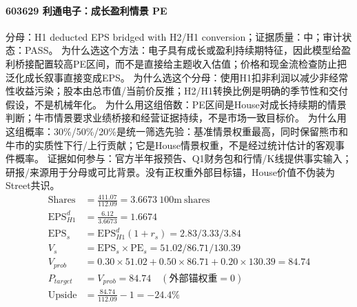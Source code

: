 \paragraph{603629 利通电子：成长盈利情景 PE}
分母：H1 deducted EPS bridged with H2/H1 conversion；证据质量：中；审计状态：PASS。
为什么选这个方法：电子具有成长或盈利持续期特征，因此模型给盈利桥接配置较高PE区间，而不是直接给主题收入估值；价格和现金流检查防止把泛化成长叙事直接变成EPS。
为什么选这个分母：使用H1扣非利润以减少非经常性收益污染；股本由总市值/当前价反推；H2/H1转换比例是明确的季节性和交付假设，不是机械年化。
为什么用这组倍数：PE区间是House对成长持续期的情景判断；牛市情景要求业绩桥接和经营证据持续，不是市场一致目标价。
为什么用这组概率：30\%/50\%/20\%是统一筛选先验：基准情景权重最高，同时保留熊市和牛市的实质性下行/上行贡献；它是House情景权重，不是经过统计估计的客观事件概率。
证据如何参与：官方半年报预告、Q1财务包和行情/K线提供事实输入；研报/来源用于分母或可比背景。没有正权重外部目标锚，House价值不伪装为Street共识。
\begin{align*}
\mathrm{Shares} &= \frac{411.07}{112.09}=3.6673\ \mathrm{100m\ shares}\\
\mathrm{EPS}_{H1}^d &= \frac{6.12}{3.6673}=1.6674\\
\mathrm{EPS}_s &= \mathrm{EPS}_{H1}^d(1+r_s)=2.83/3.33/3.84\\
V_s &= \mathrm{EPS}_s\times \mathrm{PE}_s=51.02/86.71/130.39\\
V_{prob} &= 0.30\times 51.02+0.50\times 86.71+0.20\times 130.39=84.74\\
P_{target} &= V_{prob}=84.74\quad(\text{外部锚权重}=0)\\
\mathrm{Upside} &= \frac{84.74}{112.09}-1=-24.4\%\\
\end{align*}

